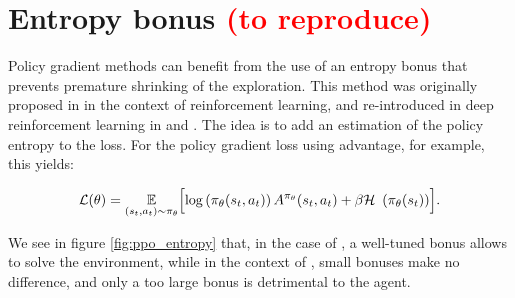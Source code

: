 

\section{Entropy bonus \textcolor{red}{(to reproduce)}}

Policy gradient methods can benefit from the use of an entropy bonus that prevents premature shrinking of the exploration. This method was originally proposed in \cite{williams1991} in the context of reinforcement learning, and re-introduced in deep reinforcement learning in \cite{a2c} and \cite{ppo}. The idea is to add an estimation of the policy entropy to the loss. For the policy gradient loss using advantage, for example, this yields:

\begin{equation}
	\mathcal{L}(\theta) = \expect{(s_t, a_t) \sim \pi_\theta} \Bigl[ \log \left( \pi_\theta (s_t, a_t) \right) A^{\pi_\theta} (s_t, a_t) + \beta \entropy \left( \pi_\theta (s_t) \right) \Bigr].
\end{equation}

We see in figure \ref{fig:ppo_entropy} that, in the case of , a well-tuned bonus allows to solve the environment, while in the context of , small bonuses make no difference, and only a too large bonus is detrimental to the agent.






